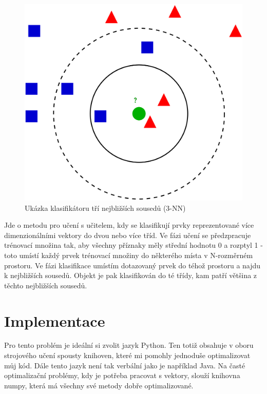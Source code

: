 \documentclass[ 12pt, a4paper]{article}
\begin{document}
\begin{figure}[!b]
	\centering
	\includegraphics[width=0.7\linewidth]{knn}
	\caption{Ukázka klasifikátoru tří nejbližších sousedů (3-NN)}
	\label{fig:knn}
\end{figure}


Jde o metodu pro učení s učitelem, kdy se klasifikují prvky reprezentované více dimenzionálními vektory do dvou nebo více tříd. Ve fázi učení se předzpracuje trénovací množina tak, aby všechny příznaky měly střední hodnotu 0 a rozptyl 1 - toto umístí každý prvek trénovací množiny do některého místa v N-rozměrném prostoru. Ve fázi klasifikace umístím dotazovaný prvek do téhož prostoru a najdu k nejbližších sousedů. Objekt je pak klasifikován do té třídy, kam patří většina z těchto nejbližších sousedů.

\newpage
\section{Implementace}
Pro tento problém je ideální si zvolit jazyk Python. Ten totiž obsahuje v oboru strojového učení spousty knihoven, které mi pomohly jednoduše optimalizovat můj kód. Dále tento jazyk není tak verbální jako je například Java. Na časté optimalizační problémy, kdy je potřeba pracovat s vektory, slouží knihovna numpy, která má všechny své metody dobře optimalizované.
\end{document}
